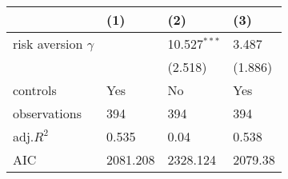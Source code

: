 \begin{tabular}{llll}
\hline
 & (1) & (2) & (3) \\
\hline
risk aversion  $\gamma$ &  & 10.527$^{***}$ & 3.487 \\
 &  & (2.518) & (1.886) \\
controls & Yes & No & Yes \\
observations & 394 & 394 & 394 \\
adj.$R^2$ & 0.535 & 0.04 & 0.538 \\
AIC & 2081.208 & 2328.124 & 2079.38 \\
\hline
\end{tabular}
